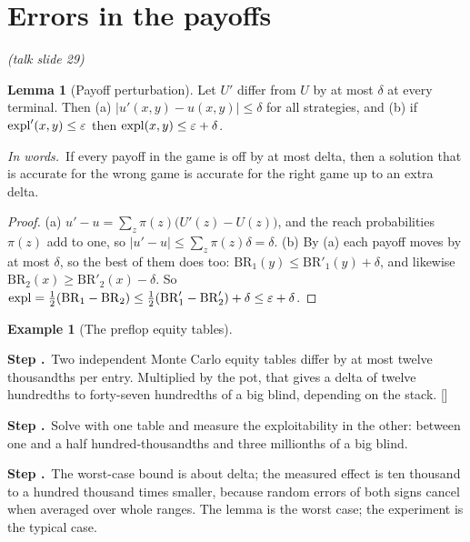 \documentclass[11pt]{article}
\theoremstyle{definition}
\newtheorem{example}[definition]{Example}
\newtheorem{lemma}[definition]{Lemma}
\newcommand{\inwords}{\par\smallskip\noindent\textit{In words.}\ }
\newcounter{stp}
\newcommand{\steps}{\setcounter{stp}{0}}
\newcommand{\st}{\stepcounter{stp}\par\medskip\noindent\textbf{Step \arabic{stp}.}\ }
\newcommand{\by}[1]{\hfill{\small\color{blue!50!black}[#1]}}
\newcommand{\slide}[1]{\hfill{\small\itshape (talk slide #1)}}
\begin{document}
\section{Errors in the payoffs}\label{sec:pert}\slide{29}
\begin{lemma}[Payoff perturbation]\label{lem:pert}
Let $U'$ differ from $U$ by at most $\delta$ at every terminal. Then (a) $|u'(x,y)-u(x,y)|\le\delta$ for all strategies, and (b) if
$\mathrm{expl}'(x,y)\le\varepsilon$ then $\mathrm{expl}(x,y)\le\varepsilon+\delta$.
\inwords If every payoff in the game is off by at most delta, then a solution that is accurate for the wrong game is
accurate for the right game up to an extra delta.
\end{lemma}
\begin{proof}
(a) $u'-u=\sum_z\pi(z)\big(U'(z)-U(z)\big)$, and the reach probabilities $\pi(z)$ add to one, so $|u'-u|\le\sum_z\pi(z)\delta=\delta$.
(b) By (a) each payoff moves by at most $\delta$, so the best of them does too: $\mathrm{BR}_1(y)\le\mathrm{BR}'_1(y)+\delta$, and likewise
$\mathrm{BR}_2(x)\ge\mathrm{BR}'_2(x)-\delta$. So $\mathrm{expl}=\tfrac12(\mathrm{BR}_1-\mathrm{BR}_2)\le\tfrac12(\mathrm{BR}'_1-\mathrm{BR}'_2)+\delta\le\varepsilon+\delta$.
\end{proof}

\begin{example}[The preflop equity tables]\label{ex:pert}
\steps
\st Two independent Monte Carlo equity tables differ by at most twelve thousandths per entry. Multiplied by the pot, that
gives a delta of twelve hundredths to forty-seven hundredths of a big blind, depending on the stack. \by{}
\st Solve with one table and measure the exploitability in the other: between one and a half hundred-thousandths and three
millionths of a big blind.
\st The worst-case bound is about delta; the measured effect is ten thousand to a hundred thousand times smaller, because
random errors of both signs cancel when averaged over whole ranges. The lemma is the worst case; the experiment is the
typical case.
\end{example}
\begin{center}\end{center}

\end{document}
